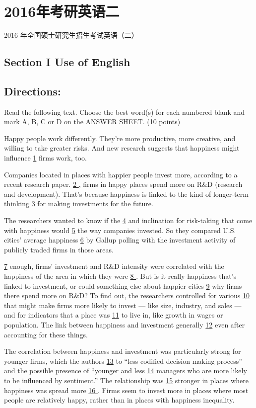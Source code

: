 \documentclass[UTF8,11pt]{ctexart}
\begin{document}
\section*{2016年考研英语二}
2016 年全国硕士研究生招生考试英语（二）


\subsection*{\textbf{Section I Use of English}}


\subsection*{\textbf{Directions:}}


Read the following text. Choose the best word(s) for each numbered blank and mark A, B, C or D on the ANSWER SHEET. (10 points)


Happy people work differently. They’re more productive, more creative, and willing to take greater risks. And new research suggests that happiness might influence \uline{1} firms work, too.


Companies located in places with happier people invest more, according to a recent research paper. \uline{2 }, firms in happy places spend more on R\&D (research and development). That’s because happiness is linked to the kind of longer-term thinking \uline{3} for making investments for the future.


The researchers wanted to know if the \uline{4} and inclination for risk-taking that come with happiness would \uline{5} the way companies invested. So they compared U.S. cities’ average happiness \uline{6} by Gallup polling with the investment activity of publicly traded firms in those areas.


\uline{7} enough, firms’ investment and R\&D intensity were correlated with the happiness of the area in which they were \uline{8 }. But is it really happiness that’s linked to investment, or could something else about happier cities \uline{9} why firms there spend more on R\&D? To find out, the researchers controlled for various \uline{10} that might make firms more likely to invest — like size, industry, and sales — and for indicators that a place was \uline{11} to live in, like growth in wages or population. The link between happiness and investment generally \uline{12} even after accounting for these things.


The correlation between happiness and investment was particularly strong for younger firms, which the authors \uline{13} to “less codified decision making process” and the possible presence of “younger and less \uline{14} managers who are more likely to be influenced by sentiment.” The relationship was \uline{15} stronger in places where happiness was spread more \uline{16 }. Firms seem to invest more in places where most people are relatively happy, rather than in places with happiness inequality.
\end{document}
